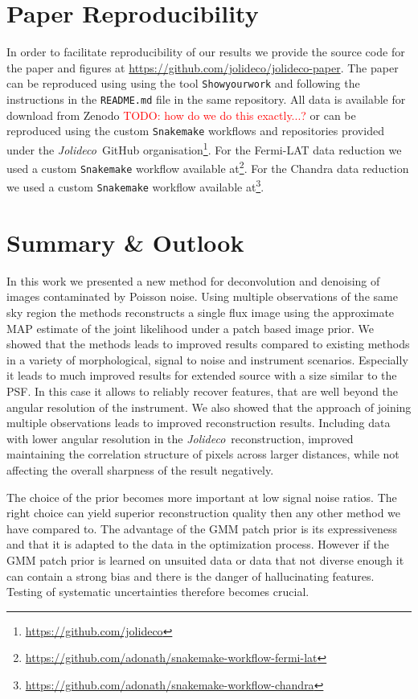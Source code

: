 \documentclass[twocolumn]{aastex631}
\newcommand{\jolideco}{\textit{Jolideco}~}
\newcommand{\todo}[1]{\textcolor{red}{TODO: #1}\PackageWarning{TODO:}{#1!}}
\begin{document}
    \section{Paper Reproducibility}
    \label{sec:reproducibility}
    In order to facilitate reproducibility of our results we provide the source code for the paper and figures at \url{https://github.com/jolideco/jolideco-paper}. The paper can be reproduced using using the tool \texttt{Showyourwork} \citep{Luger2021} and following the instructions in the \texttt{README.md} file in the same repository. All data is available for download from Zenodo \todo{how do we do this exactly...?} or can be reproduced using the custom  \texttt{Snakemake} workflows and repositories provided under the \jolideco GitHub organisation\footnote{\url{https://github.com/jolideco}}. For the Fermi-LAT data reduction we used a custom \texttt{Snakemake} workflow  available at\footnote{\url{https://github.com/adonath/snakemake-workflow-fermi-lat}}. For the Chandra data reduction we used a custom \texttt{Snakemake} workflow available at\footnote{\url{https://github.com/adonath/snakemake-workflow-chandra}}.
        
    
    \section{Summary \& Outlook}
    In this work we presented a new method for deconvolution and denoising of images contaminated by Poisson noise. Using multiple observations of the same sky region the methods reconstructs a single flux image using the approximate MAP estimate of the joint likelihood under a patch based image prior. We showed that the methods leads to improved results compared to existing methods in a variety of morphological, signal to noise and instrument scenarios. Especially it leads to much improved results for extended source with a size similar to the PSF. In this case it allows to reliably recover features, that are well beyond the angular resolution of the instrument. We also showed that the approach of joining multiple observations leads to improved reconstruction results. Including data with lower angular resolution in the \jolideco reconstruction, improved maintaining the correlation structure of pixels across larger distances, while not affecting the overall sharpness of the result negatively.

    The choice of the prior becomes more important at low signal noise ratios. The right choice can yield superior reconstruction quality then any other method we have compared to. The advantage of the GMM patch prior is its expressiveness and that it is adapted to the data in the optimization process. However if the GMM patch prior is learned on unsuited data or data that not diverse enough it can contain a strong bias and there is the danger of hallucinating features. Testing of systematic uncertainties therefore becomes crucial.
\end{document}
